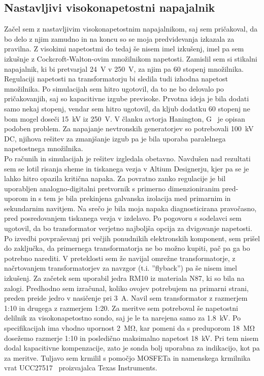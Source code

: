 \documentclass[a4paper,twoside,openright,12pt,Slovene]{book}
\begin{document}
	\subsection{Nastavljivi visokonapetostni napajalnik}
	Začel sem z nastavljivim visokonapetostnim napajalnikom, saj sem pričakoval, da bo delo z njim zamudno in na koncu so se moja predvidevanja izkazala za pravilna. Z visokimi napetostmi do tedaj še nisem imel izkušenj, imel pa sem izkušnje z Cockcroft-Walton-ovim množilnikom napetosti. Zamislil sem si stikalni napajalnik, ki bi pretvarjal \SI{24}{\volt} v \SI{250}{\volt}, za njim pa 60 stopenj množilnika. Regulaciji napetosti na transformatorju bi sledila tudi izhodna napetost množilnika. Po simulacijah sem hitro ugotovil, da to ne bo delovalo po pričakovanjih, saj so kapacitivne izgube previsoke. Prvotna ideja je bila dodati samo nekaj stopenj, vendar sem hitro ugotovil, da kljub dodatku 60 stopenj ne bom mogel doseči \SI{15}{\kilo\volt} iz \SI{250}{\volt}. V članku avtorja Hanington, G~\cite{ParallelHighVoltageMultipliers} je opisan podoben problem. Za napajanje nevtronskih generatorjev so potrebovali \SI{100}{\kilo\volt} DC, njihova rešitev za zmanjšanje izgub pa je bila uporaba paralelnega napetostnega množilnika. 
~\\Po računih in simulacijah je rešitev izgledala obetavno. Navdušen nad rezultati sem se lotil risanja sheme in tiskanega vezja v Altium Designerju, kjer pa se je lahko hitro opazila kritična napaka. Za povratno zanko regulacije je bil uporabljen analogno-digitalni pretvornik s primerno dimenzioniranim pred-uporom in s tem je bila prekinjena galvanska izolacija med primarnim in sekundarnim navitjem. Na srečo je bila moja napaka diagnosticirana pravočasno, pred posredovanjem tiskanega vezja v izdelavo. Po pogovoru s sodelavci sem ugotovil, da bo transformator verjetno najboljša opcija za dvigovanje napetosti. Po izvedbi povpraševanj pri večjih ponudnikih elektronskih komponent, sem prišel do zaključka, da primernega transformatorja ne bo možno kupiti, pač pa ga bo potrebno narediti. V preteklosti sem že navijal omrežne transformatorje, z načrtovanjem transformatorjev za navzgor (t.i. ''flyback'') pa še nisem imel izkušenj. Za začetek sem uporabil jedra RM10 iz materiala N87, ki so bila na zalogi. Predhodno sem izračunal, koliko ovojev potrebujem na primarni strani, preden preide jedro v nasičenje pri \SI{3}{\ampere}. Navil sem transformator z razmerjem 1:10 in drugega z razmerjem 1:20.
Za meritve sem potreboval še napetostni delilnik za visokonapetostno sondo, saj je le ta narejena samo za \SI{1,8}{\kilo\volt}. Po specifikacijah ima vhodno upornost \SI{2}{\mega\ohm}, kar pomeni da s preduporom \SI{18}{\mega\ohm} dosežemo razmerje 1:10 in posledično maksimalno napetost \SI{18}{\kilo\volt}. Pri tem nisem dodal kapacitivne kompenzacije, zato je sonda bolj uporabna za indikacijo, kot pa za meritve. Tuljavo sem krmilil s pomočjo MOSFETa in namenskega krmilnika vrat UCC27517~\cite{TI:UCC27517} proizvajalca Texas Instruments. 
\end{document}
